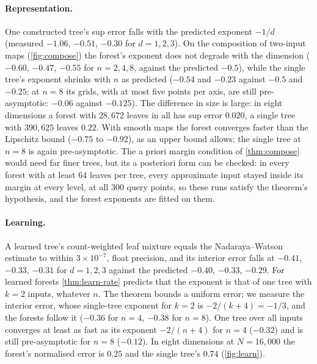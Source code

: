 \documentclass[11pt]{article}
\theoremstyle{definition}
\theoremstyle{remark}
\begin{document}
\paragraph{Representation.}
One constructed tree's sup error falls with the predicted exponent $-1/d$
(measured $-1.06$, $-0.51$, $-0.30$ for $d=1,2,3$).  On the composition of two-input maps
(\cref{fig:compose}) the forest's exponent does not degrade with the dimension ($-0.60$,
$-0.47$, $-0.55$ for $n=2,4,8$, against the predicted $-0.5$), while the single tree's exponent shrinks with $n$ as
predicted ($-0.54$ and $-0.23$ against $-0.5$ and $-0.25$; at $n=8$ its grids, with at most five
points per axis, are still pre-asymptotic: $-0.06$ against $-0.125$).  The difference in size
is large: in eight dimensions a forest with $28{,}672$ leaves in all has sup error $0.020$, a
single tree with $390{,}625$ leaves $0.22$.  With smooth maps the forest converges faster than the Lipschitz bound ($-0.75$ to
$-0.92$), as an upper bound allows; the single tree at $n=8$ is again pre-asymptotic.
The a priori margin condition of \cref{thm:compose} would need far finer trees, but its a
posteriori form can be checked: in every forest with at least $64$ leaves per tree, every
approximate input stayed inside its margin at every level, at all 300 query points, so these runs satisfy the
theorem's hypothesis, and the forest exponents are fitted on them.

\paragraph{Learning.}
A learned tree's count-weighted leaf mixture equals the Nadaraya--Watson
estimate to within $3\times10^{-7}$, float precision, and its interior error falls at $-0.41$,
$-0.33$, $-0.31$ for $d=1,2,3$ against the predicted $-0.40$, $-0.33$, $-0.29$.  For learned
forests \cref{thm:learn-rate} predicts that the exponent is that of one tree with $k=2$ inputs,
whatever $n$.  The theorem bounds a uniform error; we measure the interior error, whose
single-tree exponent for $k=2$ is $-2/(k+4)=-1/3$, and the forests follow it ($-0.36$ for
$n=4$, $-0.38$ for $n=8$).  One tree
over all inputs converges at least as fast as its exponent $-2/(n+4)$ for $n=4$ ($-0.32$) and
is still pre-asymptotic for $n=8$ ($-0.12$).  In eight dimensions at $N=16{,}000$ the forest's
normalised error is $0.25$ and the single tree's $0.74$ (\cref{fig:learn}).
\end{document}
